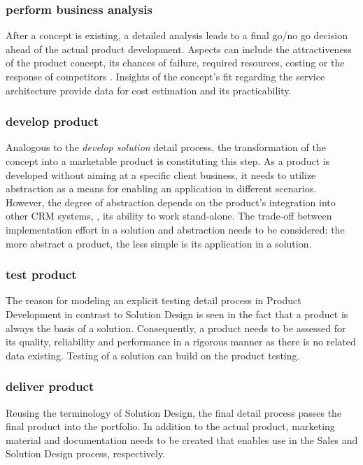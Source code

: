 	\subsubsection{perform business analysis}
	After a concept is existing, a detailed analysis leads to a final go/no go decision ahead of the actual product development. Aspects can include the attractiveness of the product concept, its chances of failure, required resources, costing or the response of competitors \citep[]{cowell1988new}. Insights of the concept's fit regarding the service architecture provide data for cost estimation and its practicability.  

	\subsubsection{develop product}
	Analogous to the \textit{develop solution} detail process, the transformation of the concept into a marketable product is constituting this step. As a product is developed without aiming at a specific client business, it needs to utilize abstraction as a means for enabling an application in different scenarios. However, the degree of abstraction depends on the product's integration into other \acrshort{CRM} systems, \ie, its ability to work stand-alone. The trade-off between implementation effort in a solution and abstraction needs to be considered: the more abstract a product, the less simple is its application in a solution. 
	
	\subsubsection{test product}
	The reason for modeling an explicit testing detail process in Product Development in contrast to Solution Design is seen in the fact that a product is always the basis of a solution. Consequently, a product needs to be assessed for its quality, reliability and performance in a rigorous manner as there is no related data existing. Testing of a solution can build on the product testing. 

	\subsubsection{deliver product}
	Reusing the terminology of Solution Design, the final detail process passes the final product into the portfolio. In addition to the actual product, marketing material and documentation needs to be created that enables use in the Sales and Solution Design process, respectively. 
	
